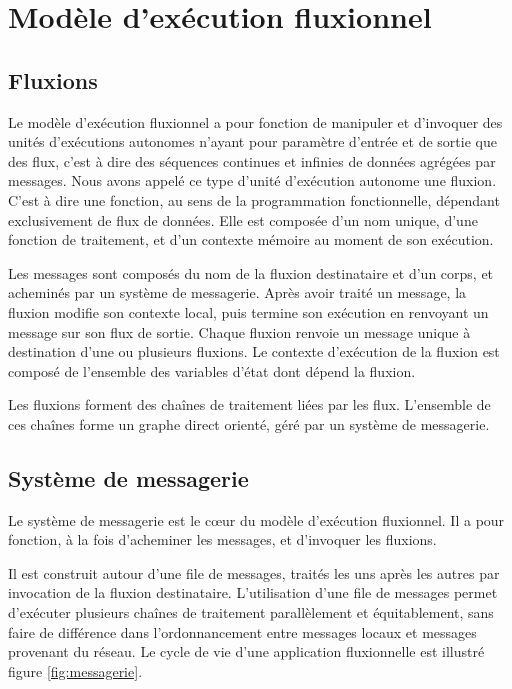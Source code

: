 \section{Modèle d'exécution fluxionnel}

\subsection{Fluxions}

Le modèle d'exécution fluxionnel a pour fonction de manipuler et d'invoquer des unités d'exécutions autonomes n'ayant pour paramètre d'entrée et de sortie que des flux, c'est à dire des séquences continues et infinies de données agrégées par messages.
Nous avons appelé ce type d'unité d'exécution autonome une fluxion.
C'est à dire une fonction, au sens de la programmation fonctionnelle, dépendant exclusivement de flux de données.
Elle est composée d'un nom unique, d'une fonction de traitement, et d'un contexte mémoire au moment de son exécution.

Les messages sont composés du nom de la fluxion destinataire et d'un corps, et acheminés par un système de messagerie.
Après avoir traité un message, la fluxion modifie son contexte local, puis termine son exécution en renvoyant un message sur son flux de sortie.
Chaque fluxion renvoie un message unique à destination d'une ou plusieurs fluxions.
Le contexte d'exécution de la fluxion est composé de l'ensemble des variables d'état dont dépend la fluxion.

Les fluxions forment des chaînes de traitement liées par les flux.
L'ensemble de ces chaînes forme un graphe direct orienté, géré par un système de messagerie.

\subsection{Système de messagerie}

Le système de messagerie est le cœur du modèle d'exécution fluxionnel.
Il a pour fonction, à la fois d'acheminer les messages, et d'invoquer les fluxions.

Il est construit autour d'une file de messages, traités les uns après les autres par invocation de la fluxion destinataire.
L'utilisation d'une file de messages permet d'exécuter plusieurs chaînes de traitement parallèlement et équitablement, sans faire de différence dans l'ordonnancement entre messages locaux et messages provenant du réseau.
Le cycle de vie d'une application fluxionnelle est illustré figure \ref{fig:messagerie}.

